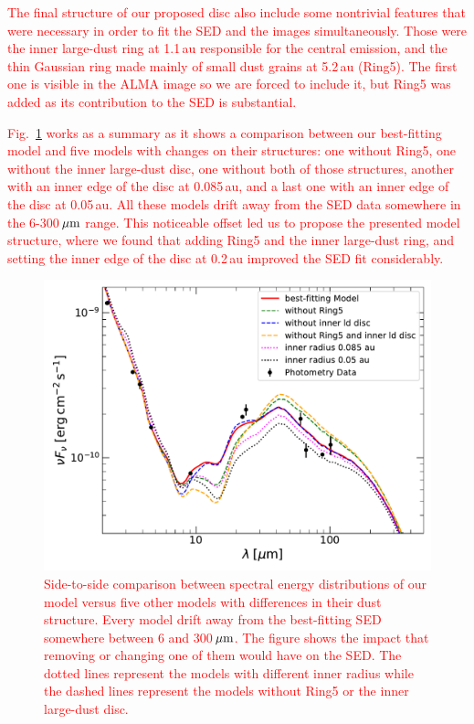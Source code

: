 \documentclass[fleqn,usenatbib,useAMS]{mnras}
\newcommand{\red}[1]{\textcolor{red}{#1}}
\begin{document}
\red{The final structure of our proposed disc also include some nontrivial features that were necessary in order to fit the SED and the images simultaneously. Those were the inner large-dust ring at 1.1\,au responsible for the central emission, and the thin Gaussian ring made mainly of small dust grains at 5.2\,au (Ring5). The first one is visible in the ALMA image so we are forced to include it, but Ring5 was added as its contribution to the SED is substantial.}

\red{Fig.~\ref{fig:SED_comparition} works as a summary as it shows a comparison between our best-fitting model and five models with changes on their structures: one without Ring5, one without the inner large-dust disc, one without both of those structures, another with an inner edge of the disc at 0.085\,au, and a last one with an inner edge of the disc at 0.05\,au. All these models drift away from the SED data somewhere in the 6-300\,$\hbox{$\mu$m}$ range. This noticeable offset led us to propose the presented model structure, where we found that adding Ring5 and the inner large-dust ring, and setting the inner edge of the disc at 0.2\,au improved the SED fit considerably.}

\begin{figure}
	\includegraphics[width=\columnwidth]{SED_three_model_comparision.pdf}
        \caption{\red{Side-to-side comparison between spectral energy distributions of our model versus five other models with differences in their dust structure. Every model drift away from the best-fitting SED somewhere between 6 and 300\,$\hbox{$\mu$m}$. The figure shows the impact that removing or changing one of them would have on the SED. The dotted lines represent the models with different inner radius while the dashed lines represent the models without Ring5 or the inner large-dust disc.}}
    \label{fig:SED_comparition}

\end{figure}

	



\bsp	%
\label{lastpage}
\end{document}
